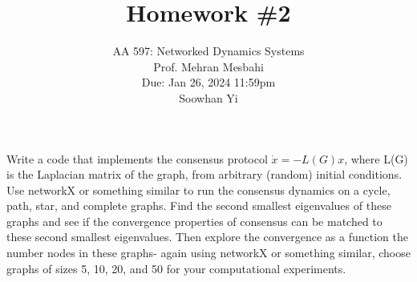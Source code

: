 \documentclass{article}
\begin{document}
\setcounter{problem}{0}
\title{Homework \#2}
\author{
    \normalsize{AA 597: Networked Dynamics Systems}\\
    \normalsize{Prof. Mehran Mesbahi}\\
    \normalsize{Due: Jan 26, 2024 11:59pm}\\
    \normalsize{Soowhan Yi}
}
\date{{}}
\maketitle
\begin{problem}
    Write a code that implements the consensus protocol  $\dot{x}=-L(G) x$, where L(G) is the Laplacian matrix of the graph,  from arbitrary (random) initial conditions. Use networkX or something similar to run the consensus dynamics on a cycle, path, star, and complete graphs. Find the second smallest eigenvalues of these graphs and see if the convergence properties of consensus  can be matched to these second smallest eigenvalues. Then explore the convergence as a function the number  nodes in these graphs- again using networkX or something similar, choose graphs of sizes 5, 10, 20, and 50 for your computational experiments.

\end{problem}
\end{document}
